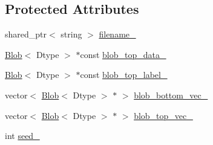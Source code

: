 \subsection*{Protected Attributes}
\begin{DoxyCompactItemize}
\item 
shared\+\_\+ptr$<$ string $>$ \hyperlink{classcaffe_1_1_data_layer_test_a96918f4c6321111e66d795f4341fd656}{filename\+\_\+}
\item 
\hyperlink{classcaffe_1_1_blob}{Blob}$<$ Dtype $>$ $\ast$const \hyperlink{classcaffe_1_1_data_layer_test_a5810c2d8664d032fd3b96dd9eeac24d8}{blob\+\_\+top\+\_\+data\+\_\+}
\item 
\hyperlink{classcaffe_1_1_blob}{Blob}$<$ Dtype $>$ $\ast$const \hyperlink{classcaffe_1_1_data_layer_test_a56fd4aed58fbf6c4a24373e9df1d732a}{blob\+\_\+top\+\_\+label\+\_\+}
\item 
vector$<$ \hyperlink{classcaffe_1_1_blob}{Blob}$<$ Dtype $>$ $\ast$ $>$ \hyperlink{classcaffe_1_1_data_layer_test_af547e93d91fa20aef8d1026b4b006a86}{blob\+\_\+bottom\+\_\+vec\+\_\+}
\item 
vector$<$ \hyperlink{classcaffe_1_1_blob}{Blob}$<$ Dtype $>$ $\ast$ $>$ \hyperlink{classcaffe_1_1_data_layer_test_a591c04139193a11697a051889cddf83d}{blob\+\_\+top\+\_\+vec\+\_\+}
\item 
int \hyperlink{classcaffe_1_1_data_layer_test_acf77bf66c5261af404bc1aa28fc3e7d0}{seed\+\_\+}
\end{DoxyCompactItemize}


